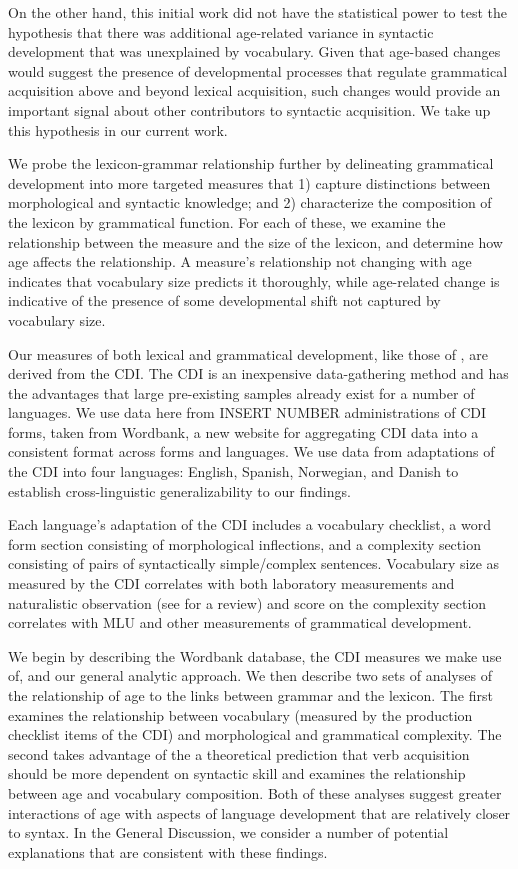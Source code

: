 \documentclass[10pt,letterpaper]{article}
\begin{document}
On the other hand, this initial work did not have the statistical power to test the hypothesis that there was additional age-related variance in syntactic development that was unexplained by vocabulary. Given that age-based changes would suggest the presence of developmental processes that regulate grammatical acquisition above and beyond lexical acquisition, such changes would provide an important signal about other contributors to syntactic acquisition. We take up this hypothesis in our current work. 

We probe the lexicon-grammar relationship further by delineating grammatical development into more targeted measures that 1) capture distinctions between morphological and syntactic knowledge; and 2) characterize the composition of the lexicon by grammatical function. For each of these, we examine the relationship between the measure and the size of the lexicon, and determine how age affects the relationship. A measure's relationship not changing with age indicates that vocabulary size predicts it thoroughly, while age-related change is indicative of the presence of some developmental shift not captured by vocabulary size.

Our measures of both lexical and grammatical development, like those of \citeauthor{bates1994}, are derived from the CDI. The CDI is an inexpensive data-gathering method and has the advantages that large pre-existing samples already exist for a number of languages. We use data here from INSERT NUMBER administrations of CDI forms, taken from Wordbank, a new website for aggregating CDI data into a consistent format across forms and languages. We use data from adaptations of the CDI into four languages: English, Spanish, Norwegian, and Danish to establish cross-linguistic generalizability to our findings.

Each language's adaptation of the CDI includes a vocabulary checklist, a word form section consisting of morphological inflections, and a complexity section consisting of pairs of syntactically simple/complex sentences. Vocabulary size as measured by the CDI correlates with both laboratory measurements and naturalistic observation (see \cite{fenson2007} for a review) and score on the complexity section correlates with MLU and other measurements of grammatical development.

We begin by describing the Wordbank database, the CDI measures we make use of, and our general analytic approach. We then describe two sets of analyses of the relationship of age to the links between grammar and the lexicon. The first examines the relationship between vocabulary (measured by the production checklist items of the CDI) and morphological and grammatical complexity. The second takes advantage of the a theoretical prediction that verb acquisition should be more dependent on syntactic skill \cite{gleitman1990} and examines the relationship between age and vocabulary composition. Both of these analyses suggest greater interactions of age with aspects of language development that are relatively closer to syntax. In the General Discussion, we consider a number of potential explanations that are consistent with these findings. 
\end{document}
